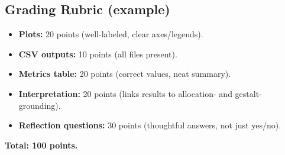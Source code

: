 \subsection*{Grading Rubric (example)}
\begin{itemize}[leftmargin=*]
  \item \textbf{Plots:} 20 points (well-labeled, clear axes/legends).
  \item \textbf{CSV outputs:} 10 points (all files present).
  \item \textbf{Metrics table:} 20 points (correct values, neat summary).
  \item \textbf{Interpretation:} 20 points (links results to allocation- and gestalt-grounding).
  \item \textbf{Reflection questions:} 30 points (thoughtful answers, not just yes/no).
\end{itemize}

\textbf{Total: 100 points.}
